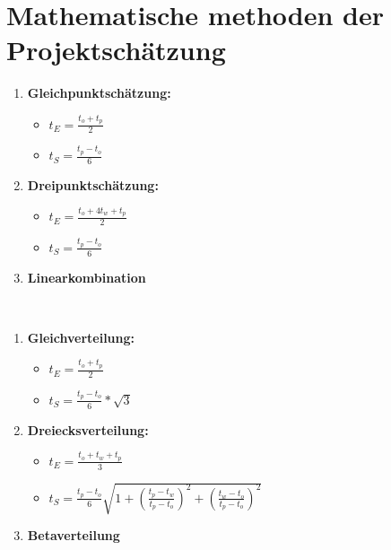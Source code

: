 \documentclass[11pt,a4paper]{article}
\begin{document}
\section{Mathematische methoden der Projektschätzung}

\begin{minipage}[t]{0.5\textwidth}

\begin{enumerate}
	\item \textbf{Gleichpunktschätzung:} 
		\begin{itemize}
			\item $t_E = \frac{t_o + t_p}{2}$ 
			\item $t_S = \frac{t_p - t_o}{6}$ 
		\end{itemize}
	\item \textbf{Dreipunktschätzung:}
		\begin{itemize}
			\item $t_E = \frac{t_o + 4t_w + t_p}{2}$ 
			\item $t_S = \frac{t_p - t_o}{6}$ 
		\end{itemize}
	\item \textbf{Linearkombination}
\end{enumerate}
\end{minipage}
~
\begin{minipage}[t]{0.49\textwidth}
\begin{enumerate}
	\item \textbf{Gleichverteilung:} 
		\begin{itemize}
			\item $t_E = \frac{t_o + t_p}{2}$ 
			\item $t_S = \frac{t_p - t_o}{6} * \sqrt{3}$ 
		\end{itemize}
	\item \textbf{Dreiecksverteilung:}
		\begin{itemize}
			\item $t_E = \frac{t_o + t_w + t_p}{3}$ 
			\item $t_S = \frac{t_p - t_o}{6}\sqrt{1 + \left(\frac{t_p-t_w}{t_p-t_o}\right)^2 + \left(\frac{t_w-t_o}{t_p-t_o}\right)^2}$ 
		\end{itemize}
	\item \textbf{Betaverteilung}
\end{enumerate}
\end{minipage}
\end{document}
